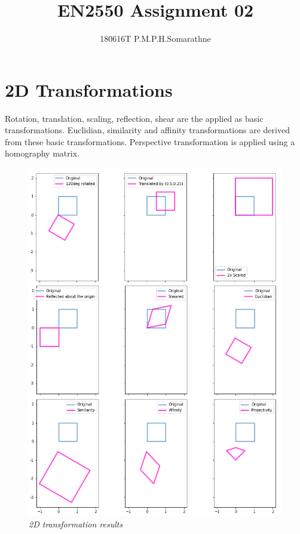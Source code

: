 \documentclass[11pt, a4paper]{article}
\title{{\Large \textbf{EN2550 Assignment 02}}}
\author{{\large 180616T P.M.P.H.Somarathne}}
\date{\tiny}
\begin{document}
\maketitle

\section{2D Transformations}
Rotation, translation, scaling, reflection, shear are the applied as basic transformations.\cite{T} Euclidian, similarity and affinity transformations are derived from these basic transformations. Perspective transformation is applied using a homography matrix.
\begin{figure}[H]
	\centering
	\includegraphics[width=.75\textwidth]{./images/2Dtransform.png}
	\caption{\textit{2D transformation results}}
	\label{fig:2Dt}
\end{figure}
\end{document}
